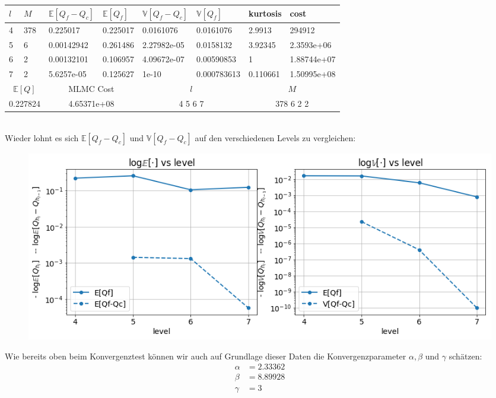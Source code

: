 \noindent\begin{tabular}{|p{0.15\q}|p{0.55\q}|p{1.4\q}|p{1.05\q}|p{1.35\q}|p{1.25\q}|p{0.9\q}|p{1.35\q}|}
	\hline
	$ l $   &  $ M $  &  $ \mathbb{E}[Q_f-Q_c] $  &   $ \mathbb{E}[Q_f] $ &  $ \mathbb{V}[Q_f-Q_c] $   &   $ \mathbb{V}[Q_f] $ &  kurtosis    &    cost\\
	\hline
	4 &  378 &   0.225017  &  0.225017 &  0.0161076 &  0.0161076  &    2.9913&      294912 \\
	5 &    6 & 0.00142942  &  0.261486 &2.27982e-05 &  0.0158132  &   3.92345&  2.3593e+06 \\
	6 &    2 & 0.00132101  &  0.106957 &4.09672e-07 & 0.00590853  &         1& 1.88744e+07 \\
	7 &    2 & 5.6257e-05  &  0.125627 &      1e-10 &0.000783613  &  0.110661& 1.50995e+08 \\
	\hline
	\multicolumn{2}{|c|}{$ \mathbb{E}[Q] $ }  &  \multicolumn{2}{c|}{MLMC Cost}   & \multicolumn{2}{c|}{$ l $}  &    \multicolumn{2}{c|}{$ M$} \\
	\hline
	\multicolumn{2}{|c|}{0.227824} & \multicolumn{2}{c|}{4.65371e+08  } &  \multicolumn{2}{c|}{   4 5 6 7}     & \multicolumn{2}{c|}{  378 6 2 2}    \\
	\hline 
\end{tabular}\\
Wieder lohnt es sich $ \mathbb{E}[Q_f-Q_c] $ und $ \mathbb{V}[Q_f-Q_c] $ auf den verschiedenen Levels zu vergleichen:
\begin{figure}[H]
	\centering
	\includegraphics[width=\textwidth]{plots/eps001.png} 
\end{figure}
Wie bereits oben beim Konvergenztest können wir auch auf Grundlage dieser Daten die Konvergenzparameter $ \alpha, \beta $ und  $ \gamma $ schätzen:
\begin{align*}
\alpha  &=     2.33362   \\
\beta   &=    8.89928   \\
\gamma  &=    3  \\
\end{align*}

